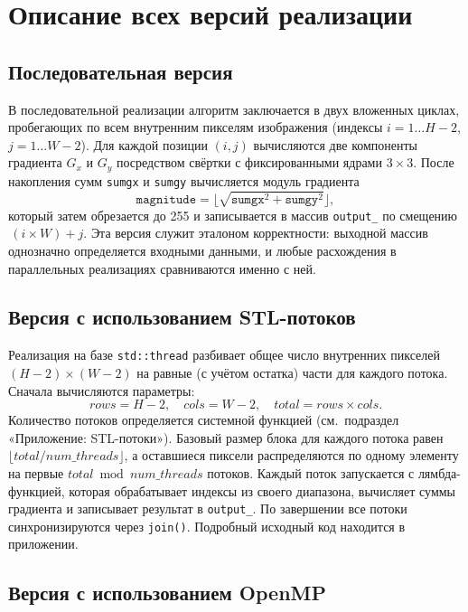 \documentclass[12pt]{article}
\begin{document}
\section{Описание всех версий реализации}

\subsection{Последовательная версия}

В последовательной реализации алгоритм заключается в двух вложенных циклах, пробегающих по всем внутренним пикселям изображения (индексы $i=1\ldots H-2$, $j=1\ldots W-2$). Для каждой позиции $(i,j)$ вычисляются две компоненты градиента $G_x$ и $G_y$ посредством свёртки с фиксированными ядрами $3\times3$. После накопления сумм \texttt{sumgx} и \texttt{sumgy} вычисляется модуль градиента
\[
    \texttt{magnitude} = \lfloor \sqrt{\texttt{sumgx}^2 + \texttt{sumgy}^2} \rfloor,
\]
который затем обрезается до 255 и записывается в массив \texttt{output\_} по смещению \(\,(i \times W) + j\). Эта версия служит эталоном корректности: выходной массив однозначно определяется входными данными, и любые расхождения в параллельных реализациях сравниваются именно с ней.

\subsection{Версия с использованием STL-потоков}

Реализация на базе \texttt{std::thread} разбивает общее число внутренних пикселей \((H-2)\times(W-2)\) на равные (с учётом остатка) части для каждого потока. Сначала вычисляются параметры:
\[
    rows = H - 2,\quad cols = W - 2,\quad total = rows \times cols.
\]
Количество потоков определяется системной функцией (см.\ подраздел «Приложение: STL-потоки»). Базовый размер блока для каждого потока равен \(\lfloor total / num\_threads\rfloor\), а оставшиеся пиксели распределяются по одному элементу на первые \(total \bmod num\_threads\) потоков. Каждый поток запускается с лямбда-функцией, которая обрабатывает индексы из своего диапазона, вычисляет суммы градиента и записывает результат в \texttt{output\_}. По завершении все потоки синхронизируются через \texttt{join()}. Подробный исходный код находится в приложении.

\subsection{Версия с использованием OpenMP}
\end{document}

